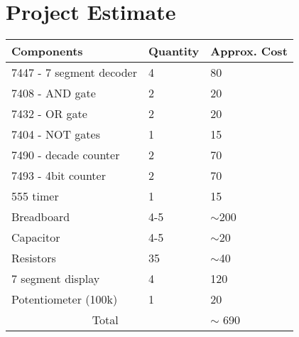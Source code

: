 \documentclass[12pt, a4paper]{article}
\begin{document}
\section*{\Large Project Estimate}

\begin{tabular}{ |p{5cm}|p{3cm}|p{3cm}|  }
 \hline
 Components & Quantity & Approx. Cost \\
 \hline
7447 - 7 segment decoder & 4 & 80 \\
7408 - AND gate & 2 & 20 \\
7432 - OR gate & 2 & 20 \\
7404 - NOT gates & 1 & 15 \\
7490 - decade counter & 2 & 70 \\
7493 - 4bit counter & 2 & 70 \\
555 timer & 1 & 15 \\
Breadboard & 4-5 & $\sim$200 \\
Capacitor & 4-5 & $\sim$20 \\
Resistors & 35 & $\sim$40 \\
7 segment display & 4 & 120 \\
Potentiometer (100k) & 1 & 20 \\
\hline
\multicolumn{2}{|c|}{Total} & $\sim$ 690 \\

 \hline
\end{tabular}
\end{document}
